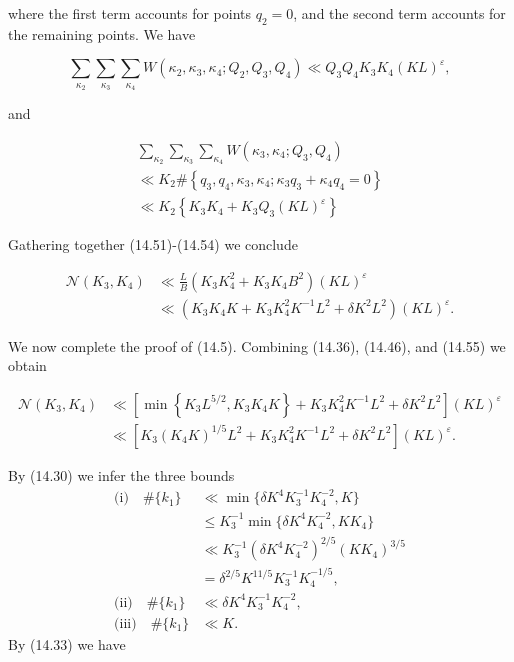 \documentclass[10pt]{article}
\begin{document}
where the first term accounts for points $q_{2}=0$, and the second term accounts for the remaining points. We have


\begin{equation*}
\sum_{\kappa_{2}} \sum_{\kappa_{3}} \sum_{\kappa_{4}} W\left(\kappa_{2}, \kappa_{3}, \kappa_{4} ; Q_{2}, Q_{3}, Q_{4}\right) \ll Q_{3} Q_{4} K_{3} K_{4}(K L)^{\varepsilon}, \tag{14.53}
\end{equation*}


and


\begin{gather*}
\sum_{\kappa_{2}} \sum_{\kappa_{3}} \sum_{\kappa_{4}} W\left(\kappa_{3}, \kappa_{4} ; Q_{3}, Q_{4}\right) \\
\ll K_{2} \#\left\{q_{3}, q_{4}, \kappa_{3}, \kappa_{4} ; \kappa_{3} q_{3}+\kappa_{4} q_{4}=0\right\}  \tag{14.54}\\
\ll K_{2}\left\{K_{3}K_{4}+K_{3}Q_{3}(KL)^{\varepsilon}\right\}
\end{gather*}


Gathering together (14.51)-(14.54) we conclude


\begin{align*}
\mathscr{N}(K_{3},K_{4}) & \ll \frac{L}{B}\left(K_{3} K_{4}^{2}+K_{3} K_{4} B^{2}\right)(K L)^{\varepsilon} \\
& \ll\left(K_{3} K_{4} K+K_{3} K_{4}^{2} K^{-1} L^{2}+\delta K^{2} L^{2}\right)(K L)^{\varepsilon} . \tag{14.55}
\end{align*}


We now complete the proof of (14.5). Combining (14.36), (14.46), and (14.55) we obtain

$$
\begin{aligned}
\mathscr{N}(K_{3},K_{4}) & \ll\left[\min \left\{K_{3} L^{5 / 2}, K_{3} K_{4} K\right\}+K_{3} K_{4}^{2} K^{-1} L^{2}+\delta K^{2} L^{2}\right](K L)^{\varepsilon} \\
& \ll\left[K_{3}\left(K_{4} K\right)^{1 / 5} L^{2}+K_{3} K_{4}^{2} K^{-1} L^{2}+\delta K^{2} L^{2}\right](K L)^{\varepsilon} .
\end{aligned}
$$

By (14.30) we infer the three bounds
\begin{align*}
\text{(i)}\quad \#\{k_{1}\}
&\ll \min\{\delta K^{4}K_{3}^{-1}K_{4}^{-2},K\} \\
&\leqslant K_{3}^{-1}\min\{\delta K^{4}K_{4}^{-2},KK_{4}\} \\
&\ll K_{3}^{-1}\left(\delta K^{4}K_{4}^{-2}\right)^{2/5}
       \left(KK_{4}\right)^{3/5} \\
&=\delta^{2/5}K^{11/5}K_{3}^{-1}K_{4}^{-1/5},\\
\text{(ii)}\quad \#\{k_{1}\}
&\ll \delta K^{4}K_{3}^{-1}K_{4}^{-2},\\
\text{(iii)}\quad \#\{k_{1}\}
&\ll K.
\end{align*}
By (14.33) we have
\end{document}
